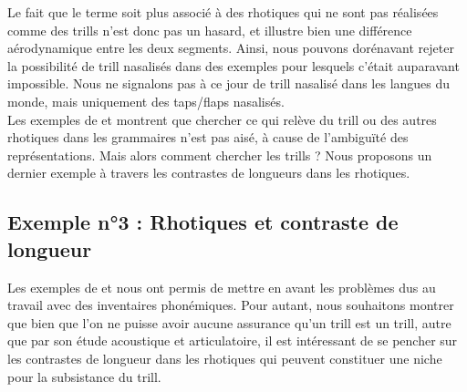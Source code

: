 Le fait que le terme  soit plus associé à des rhotiques qui ne sont pas réalisées comme des trills n'est donc pas un hasard, et illustre bien une différence aérodynamique entre les deux segments. 
Ainsi, nous pouvons dorénavant rejeter la possibilité de trill nasalisés dans des exemples pour lesquels c'était auparavant impossible.
Nous ne signalons pas à ce jour de trill nasalisé dans les langues du monde, mais uniquement des taps/flaps nasalisés.\\


Les exemples de  et  montrent que chercher ce qui relève du trill ou des autres rhotiques dans les grammaires n'est pas aisé, à cause de l'ambiguïté des représentations.
Mais alors comment chercher les trills ? Nous proposons un dernier exemple à travers les contrastes de longueurs dans les rhotiques.


\subsection{Exemple n°3 : Rhotiques et contraste de longueur}

Les exemples de  et  nous ont permis de mettre en avant les problèmes dus au travail avec des inventaires phonémiques. Pour autant, nous souhaitons montrer que bien que l'on ne puisse avoir aucune assurance qu'un trill est un trill, autre que par son étude acoustique et articulatoire, il est intéressant de se pencher sur les contrastes de longueur dans les rhotiques qui peuvent constituer une niche pour la subsistance du trill.\\

